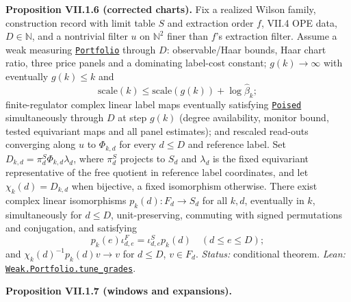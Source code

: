 \documentclass[
  letterpaper,
  11pt]{article}
\begin{document}
\textbf{Proposition VII.1.6 (corrected charts).} Fix a realized Wilson
family, construction record with limit table \(S\) and extraction order
\(f\), VII.4 OPE data, \(D\in\mathbb N\), and a nontrivial filter \(u\)
on \(\mathbb N^2\) finer than \(f\)'s extraction filter. Assume a weak
measuring
\href{https://github.com/yang-mills-group/OpenAI-YM-20261028/blob/3456e5e75cf8d4cd558955a5c7638fba2d68f464/YM/SharpGram/Weak/Reading.lean\#L35-L49}{\texttt{Portfolio}}
through \(D\): observable/Haar bounds, Haar chart ratio, three price
panels and a dominating label-cost constant; \(g(k)\to\infty\) with
eventually \(g(k)\le k\) and
\[\mathrm{scale}(k)\le\mathrm{scale}(g(k))+\log\hat\beta_k;\]
finite-regulator complex linear label maps eventually satisfying
\href{https://github.com/yang-mills-group/OpenAI-YM-20261028/blob/3456e5e75cf8d4cd558955a5c7638fba2d68f464/YM/MergeProof/East/Plume.lean\#L23-L27}{\texttt{Poised}}
simultaneously through \(D\) at step \(g(k)\) (degree availability,
monitor bound, tested equivariant maps and all panel estimates); and
rescaled read-outs converging along \(u\) to \(\Phi_{k,d}\) for every
\(d\le D\) and reference label. Set
\(D_{k,d}=\pi_d^S\Phi_{k,d}\lambda_d\), where \(\pi_d^S\) projects to
\(S_d\) and \(\lambda_d\) is the fixed equivariant representative of the
free quotient in reference label coordinates, and let
\(\chi_k(d)=D_{k,d}\) when bijective, a fixed isomorphism otherwise.
There exist complex linear isomorphisms \(p_k(d):F_d\to S_d\) for all
\(k,d\), eventually in \(k\), simultaneously for \(d\le D\),
unit-preserving, commuting with signed permutations and conjugation, and
satisfying
\[p_k(e)\iota^F_{d,e}=\iota^S_{d,e}p_k(d)\quad(d\le e\le D);\] and
\(\chi_k(d)^{-1}p_k(d)v\to v\) for \(d\le D\), \(v\in F_d\).
\emph{Status:} conditional theorem. \emph{Lean:}
\href{https://github.com/yang-mills-group/OpenAI-YM-20261028/blob/3456e5e75cf8d4cd558955a5c7638fba2d68f464/YM/SharpGram/Weak/Compatible.lean\#L140-L159}{\texttt{Weak.Portfolio.tune\_grades}}.

\textbf{Proposition VII.1.7 (windows and expansions).}
\end{document}
